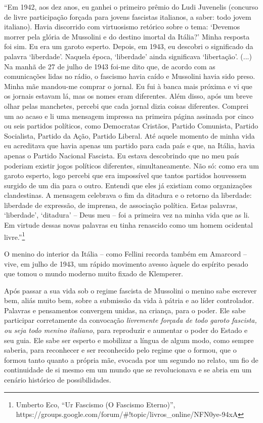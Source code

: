 ``Em 1942, aos dez anos, eu ganhei o primeiro prêmio do Ludi Juvenelis
(concurso de livre participação forçada para jovens fascistas italianos,
a saber: todo jovem italiano). Havia discorrido com virtuosismo retórico
sobre o tema: `Devemos morrer pela glória de Mussolini e do destino
imortal da Itália?' Minha resposta foi sim. Eu era um garoto esperto.
Depois, em 1943, eu descobri o significado da palavra `liberdade'.
Naquela época, `liberdade' ainda significava `libertação'. (...) Na
manhã de 27 de julho de 1943 foi-me dito que, de acordo com as
comunicações lidas no rádio, o fascismo havia caído e Mussolini havia
sido preso. Minha mãe mandou-me comprar o jornal. Eu fui à banca mais
próxima e vi que os jornais estavam lá, mas os nomes eram diferentes.
Além disso, após um breve olhar pelas manchetes, percebi que cada jornal
dizia coisas diferentes. Comprei um ao acaso e li uma mensagem impressa
na primeira página assinada por cinco ou seis partidos políticos, como
Democratas Cristãos, Partido Comunista, Partido Socialista, Partido da
Ação, Partido Liberal. Até aquele momento de minha vida eu acreditava
que havia apenas um partido para cada país e que, na Itália, havia
apenas o Partido Nacional Fascista. Eu estava descobrindo que no meu
país poderiam existir jogos políticos diferentes, simultaneamente. Não
só: como era um garoto esperto, logo percebi que era impossível que
tantos partidos houvessem surgido de um dia para o outro. Entendi que
eles já existiam como organizações clandestinas. A mensagem celebrava o
fim da ditadura e o retorno da liberdade: liberdade de expressão, de
imprensa, de associação política. Estas palavras, `liberdade',
`ditadura' -- Deus meu -- foi a primeira vez na minha vida que as li. Em
virtude dessas novas palavras eu tinha renascido como um homem ocidental
livre.''\footnote{Umberto Eco, ``Ur Fascismo (O Fascismo Eterno)'',
  https://groups.google.com/forum/\#!topic/livros\_online/NFN0ye-94xA}

O menino do interior da Itália -- como Fellini recorda também em
Amarcord -- vive, em julho de 1943, um rápido movimento avesso àquele do
espírito pesado que tomou o mundo moderno muito fixado de Klemperer.

Após passar a sua vida sob o regime fascista de Mussolini o menino sabe
escrever bem, aliás muito bem, sobre a submissão da vida à pátria e ao
líder controlador. Palavras e pensamentos convergem unidas, na criança,
para o poder. Ele sabe participar corretamente da convocação
\emph{livremente forçada de todo garoto fascista, ou seja todo menino
italiano}, para reproduzir e aumentar o poder do Estado e seu guia. Ele
sabe ser esperto e mobilizar a língua de algum modo, como sempre
saberia, para reconhecer e ser reconhecido pelo regime que o formou, que
o formou tanto quanto a própria mãe, evocada por um segundo no relato,
um fio de continuidade de si mesmo em um mundo que se revolucionava e se
abria em um cenário histórico de possibilidades.

